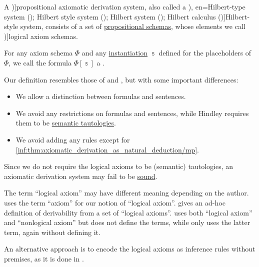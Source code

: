 \begin{definition}\label{def:axiomatic_derivation_system}\mimprovised
  A \term[en=axiomatic system (\cite[6D1]{Hindley1997BasicSTT})]{propositional axiomatic derivation system}, also called a \term[ru=исчисление высказываний гильбертовского типа (\cite[35]{Герасимов2011Вычислимость}), en=Hilbert-type system (\cite[80]{Smullyan1995FOL}); Hilbert style system (\cite[6D1]{Hindley1997BasicSTT}); Hilbert system (\cite[33]{TroelstraSchwichtenberg2000BasicProofTheory}); Hilbert calculus (\cite[103]{Mimram2020ProgramEqualsProof})]{Hilbert-style system}, consists of a set of \hyperref[def:propositional_formula_schema]{propositional schemas}, whose elements we call \term[en=axiom schema (\cite[80]{Smullyan1995FOL})]{logical axiom schemas}.

  For any axiom schema \( \Phi \) and any \hyperref[def:propositional_schema_instantiation]{instantiation} \( \Bbbs \) defined for the placeholders of \( \Phi \), we call the formula \( \Phi[\Bbbs] \) a .
\end{definition}
\begin{comments}
  \item Our definition resembles those of  and , but with some important differences:
  \begin{itemize}
    \item We allow a distinction between formulas and sentences.
    \item We avoid any restrictions on formulas and sentences, while Hindley requires them to be \hyperref[def:propositional_tautology]{semantic tautologies}.
    \item We avoid adding any rules except for \ref{inf:thm:axiomatic_derivation_as_natural_deduction/mp}.
  \end{itemize}

  \item Since we do not require the logical axioms to be (semantic) tautologies, an axiomatic derivation system may fail to be \hyperref[def:logical_framework/soundness]{sound}.

  \item The term \enquote{logical axiom} may have different meaning depending on the author.  uses the term \enquote{axiom} for our notion of \enquote{logical axiom}.  gives an ad-hoc definition of derivability from a set of \enquote{logical axioms}.  uses both \enquote{logical axiom} and \enquote{nonlogical axiom} but does not define the terms, while  only uses the latter term, again without defining it.

  \item An alternative approach is to encode the logical axioms as inference rules without premises, as it is done in \cite[103]{Mimram2020ProgramEqualsProof}.
\end{comments}

